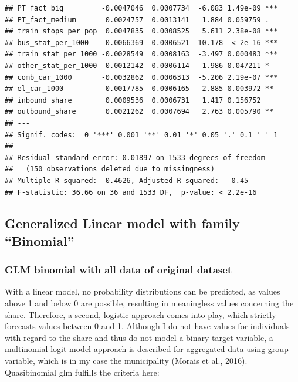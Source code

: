 \documentclass[
]{article}
\newenvironment{Shaded}{\begin{snugshade}}{\end{snugshade}}
\newcommand{\CommentTok}[1]{\textcolor[rgb]{0.56,0.35,0.01}{\textit{#1}}}
\begin{document}
\begin{verbatim}
## PT_fact_big         -0.0047046  0.0007734  -6.083 1.49e-09 ***
## PT_fact_medium       0.0024757  0.0013141   1.884 0.059759 .  
## train_stops_per_pop  0.0047835  0.0008525   5.611 2.38e-08 ***
## bus_stat_per_1000    0.0066369  0.0006521  10.178  < 2e-16 ***
## train_stat_per_1000 -0.0028549  0.0008163  -3.497 0.000483 ***
## other_stat_per_1000  0.0012142  0.0006114   1.986 0.047211 *  
## comb_car_1000       -0.0032862  0.0006313  -5.206 2.19e-07 ***
## el_car_1000          0.0017785  0.0006165   2.885 0.003972 ** 
## inbound_share        0.0009536  0.0006731   1.417 0.156752    
## outbound_share       0.0021262  0.0007694   2.763 0.005790 ** 
## ---
## Signif. codes:  0 '***' 0.001 '**' 0.01 '*' 0.05 '.' 0.1 ' ' 1
## 
## Residual standard error: 0.01897 on 1533 degrees of freedom
##   (150 observations deleted due to missingness)
## Multiple R-squared:  0.4626, Adjusted R-squared:   0.45 
## F-statistic: 36.66 on 36 and 1533 DF,  p-value: < 2.2e-16
\end{verbatim}

\begin{Shaded}
\end{Shaded}

\hypertarget{generalized-linear-model-with-family-binomial}{%
\subsection{Generalized Linear model with family
``Binomial''}\label{generalized-linear-model-with-family-binomial}}

\hypertarget{glm-binomial-with-all-data-of-original-dataset}{%
\subsubsection{GLM binomial with all data of original
dataset}\label{glm-binomial-with-all-data-of-original-dataset}}

With a linear model, no probability distributions can be predicted, as
values above 1 and below 0 are possible, resulting in meaningless values
concerning the share. Therefore, a second, logistic approach comes into
play, which strictly forecasts values between 0 and 1. Although I do not
have values for individuals with regard to the share and thus do not
model a binary target variable, a multinomial logit model approach is
described for aggregated data using group variable, which is in my case
the municipality (Morais et al., 2016). Quasibinomial glm fulfills the
criteria here:
\end{document}
